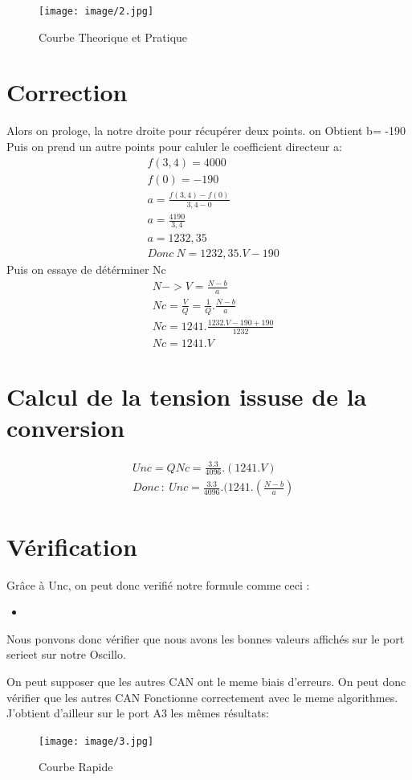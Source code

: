 \documentclass[10pt,a4paper]{article}
\newcommand{\insertcode}[2]{\begin{itemize}\item[]\end{itemize}}
\begin{document}
\begin{figure}[h!]
\centering
\texttt{[image: image/2.jpg]}
\caption{Courbe Theorique et  Pratique }
\label{fig:net }
\end{figure}
\section{Correction}
Alors on prologe, la notre droite pour récupérer deux points. on Obtient b= -190 
Puis on prend un autre points pour caluler le coefficient directeur a:
\begin{equation}\label{xx}
\begin{split}
&f(3,4)=4000\\
&f(0)=-190\\
&a=\frac{f(3,4)-f(0)}{3,4-0}\\
&a=\frac{4190}{3,4}\\
&a=1232,35\\
&Donc\ N= 1232,35.V-190
\end{split}
\end{equation}
Puis on essaye de détérminer Nc
\begin{equation}\label{xx}
\begin{split}
&N-> V=\frac{N-b}{a}\\
&Nc=\frac{V}{Q}=\frac{1}{Q}.\frac{N-b}{a}\\
&Nc=1241.\frac{1232.V-190+190}{1232}\\
&Nc=1241.V
\end{split}
\end{equation}
\section{Calcul de la tension issuse de la conversion}
\begin{equation}\label{xx}
\begin{split}
 &Unc = QNc = \frac{3.3}{4096}.(1241.V)\\
 &Donc\ :\ Unc = \frac{3.3}{4096}.(1241.(\frac{N-b}{a})
\end{split}
\end{equation}
\section{Vérification}
Grâce à Unc, on peut donc verifié notre formule comme ceci :
\insertcode{code/Unc.ino}{code}
Nous ponvons donc vérifier que nous avons les bonnes valeurs affichés sur le port serieet sur notre Oscillo.


On peut supposer que les autres CAN ont le meme biais d'erreurs. On peut donc vérifier que les autres CAN Fonctionne correctement avec le meme algorithmes.
J'obtient d'ailleur sur le port A3 les mêmes résultats:
\begin{figure}[h!]
\centering
\texttt{[image: image/3.jpg]}
\caption{Courbe Rapide}
\label{fig:net }
\end{figure}\newpage
\end{document}
